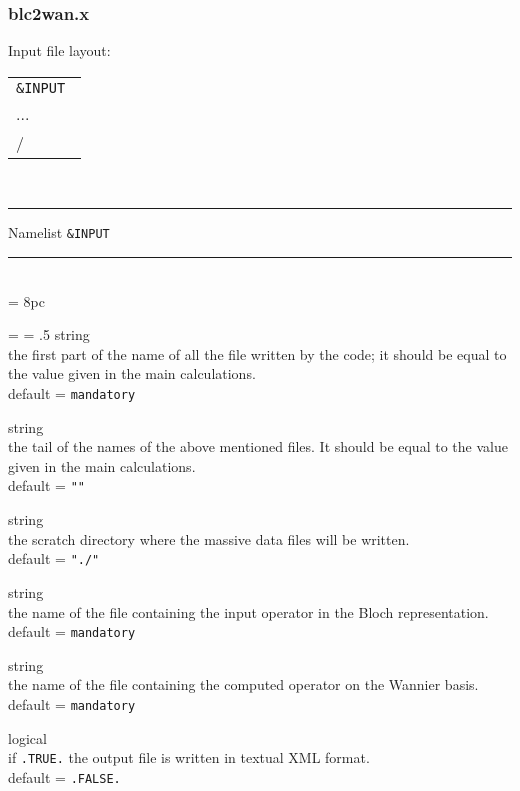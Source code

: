 \subsubsection{blc2wan.x}
\noindent Input file layout: \\

%
%
\begin{tabular}{l}
  {\tt \&INPUT } \\
  ... \\
  / \\
\end{tabular}
%
%
\\

\begin{centering}
\rule{2.2in}{0.01in} Namelist {\tt \&INPUT} \rule{2.2in}{0.01in}
\end{centering}\\

\newdimen\descindent \descindent = 8pc
{\noindent \leftskip = \descindent \parskip = .5\baselineskip
{}%
{\sc string} \\ the first part of the name of all the file written by the code;
              it should be equal to the value given in the main calculations.\\
              {\sc default} = {\tt mandatory} \par

\noindent{}%
{\sc string} \\ the tail of the names of the above mentioned files.
              It should be equal to the value given in the main calculations.\\
              {\sc default} = {\tt ""} \par

\noindent{}%
{\sc string} \\ the scratch directory where the massive data files will be written.\\
              {\sc default} = {\tt "./"} \par

\noindent{}%
{\sc string} \\ the name of the file containing the input operator in the Bloch
                representation.\\
              {\sc default} = {\tt mandatory} \par

\noindent{}%
{\sc string} \\ the name of the file containing the computed operator on the
                Wannier basis.\\
              {\sc default} = {\tt mandatory} \par

\noindent{}%
{\sc logical} \\ if {\tt .TRUE.} the output file is written in textual XML format.\\
              {\sc default} = {\tt .FALSE.} \par
}

